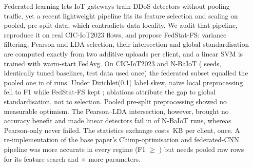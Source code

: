 Federated learning lets IoT gateways train DDoS detectors without pooling traffic, yet a recent lightweight pipeline fits its feature selection and scaling on pooled, pre-split data, which contradicts data locality. We audit that pipeline, reproduce it on real CIC-IoT2023 flows, and propose FedStat-FS: variance filtering, Pearson and LDA selection, their intersection and global standardisation are computed exactly from two additive uploads per client, and a linear SVM is trained with warm-start FedAvg. On CIC-IoT2023 and N-BaIoT ( seeds, identically tuned baselines, test data used once) the federated subset equalled the pooled one in  of  runs. Under Dirichlet(0.1) label skew, naive local preprocessing fell to F1  while FedStat-FS kept ; ablations attribute the gap to global standardisation, not to selection. Pooled pre-split preprocessing showed no measurable optimism. The Pearson--LDA intersection, however, brought no accuracy benefit and made linear detectors fail in  of  N-BaIoT runs, whereas Pearson-only never failed. The statistics exchange costs \,KB per client, once. A re-implementation of the base paper's Chimp-optimisation and federated-CNN pipeline was more accurate in every regime (F1 $\ge$ ) but needs pooled raw rows for its feature search and $\times$ more parameters.
